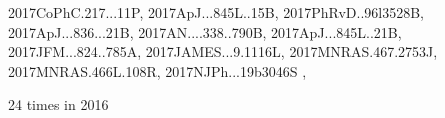 \documentclass[12pt]{article}
\begin{document}
\begin{description}
{2017CoPhC.217...11P,%
2017ApJ...845L..15B,%
2017PhRvD..96l3528B,%
2017ApJ...836...21B,%
2017AN....338..790B,%
2017ApJ...845L..21B,%
2017JFM...824..785A,%
2017JAMES...9.1116L,%
2017MNRAS.467.2753J,%
2017MNRAS.466L.108R,%
2017NJPh...19b3046S%
},\item 24 times in 2016 \citep{
2016PhRvL.116j1101C,%
2016MNRAS.462.4402C,%
2016ApJ...833...43C,%
2016ApJ...832..150C,%
2016MNRAS.462..818B,%
2016arXiv160606725A,%
2016arXiv160209105O,%
2016arXiv160700980O,%
2016arXiv160703720K,%
2016MNRAS.461..240B,%
2016ApJS..224...39Y,%
2016A&A...593A.134C,%
2016PhyS...91j4008K,%
2016A&A...589A.125W,%
2016MNRAS.459.4046J,%
2016A&A...591A.133L,%
}
\end{description}
\end{document}
